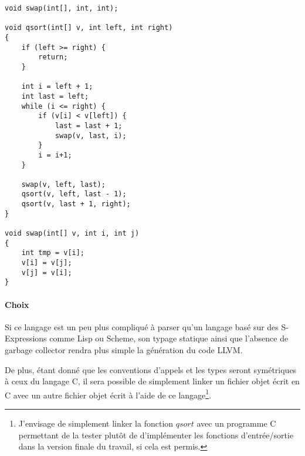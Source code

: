 \documentclass[a4paper]{article}
\begin{document}
\begin{lstlisting}
void swap(int[], int, int);

void qsort(int[] v, int left, int right)
{
    if (left >= right) {
        return;
    }

    int i = left + 1;
    int last = left;
    while (i <= right) {
        if (v[i] < v[left]) {
            last = last + 1;
            swap(v, last, i);
        }
        i = i+1;
    }

    swap(v, left, last);
    qsort(v, left, last - 1);
    qsort(v, last + 1, right);
}

void swap(int[] v, int i, int j)
{
    int tmp = v[i];
    v[i] = v[j];
    v[j] = v[i];
}
\end{lstlisting}

    \paragraph{Choix} Si ce langage est un peu plus compliqué à parser qu'un
langage basé sur des S-Expressions comme Lisp ou Scheme, son typage statique
ainsi que l'absence de garbage collector rendra plus simple la génération du
code LLVM.

De plus, étant donné que les conventions d'appels et les types seront
symétriques à ceux du langage C, il sera possible de simplement linker un
fichier objet écrit en C avec un autre fichier objet écrit à l'aide de ce
langage\footnote{J'envisage de simplement linker la fonction $qsort$ avec un
programme C permettant de la tester plutôt de d'implémenter les fonctions
d'entrée/sortie dans la version finale du travail, si cela est permis.}.
\end{document}
